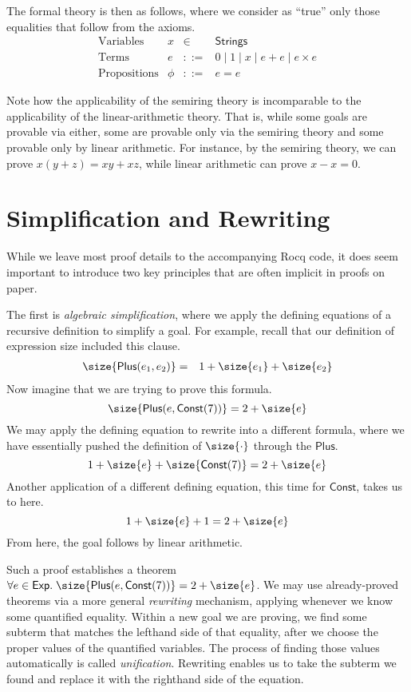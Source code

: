 \documentclass{amsbook}
\theoremstyle{definition}
\theoremstyle{remark}
\numberwithin{section}{chapter}
\numberwithin{equation}{chapter}
\begin{document}
The formal theory is then as follows, where we consider as ``true'' only those equalities that follow from the axioms.
$$\begin{array}{rrcl}
  \textrm{Variables} & x &\in& \mathsf{Strings} \\
  \textrm{Terms} & e &::=& 0 \mid 1 \mid x \mid e + e \mid e \times e \\
  \textrm{Propositions} & \phi &::=& e = e
\end{array}$$

Note how the applicability of the semiring theory is incomparable to the applicability of the linear-arithmetic theory.
That is, while some goals are provable via either, some are provable only via the semiring theory and some provable only by linear arithmetic.
For instance, by the semiring theory, we can prove $x(y + z) = xy + xz$, while linear arithmetic can prove $x - x = 0$.

\section{Simplification and Rewriting}

While we leave most proof details to the accompanying Rocq code, it does seem important to introduce two key principles that are often implicit in proofs on paper.

The first is \emph{algebraic simplification}, where we apply the defining equations of a recursive definition to simplify a goal.
For example, recall that our definition of expression size included this clause.
\begin{eqnarray*}
  \size{\mathsf{Plus}(e_1, e_2)} &=& 1 + \size{e_1} + \size{e_2}
\end{eqnarray*}
Now imagine that we are trying to prove this formula.
$$\size{\mathsf{Plus}(e, \mathsf{Const}(7))} = 2 + \size{e}$$
We may apply the defining equation to rewrite into a different formula, where we have essentially pushed the definition of $\size{\cdot}$ through the $\mathsf{Plus}$.
$$1 + \size{e} + \size{\mathsf{Const}(7)} = 2 + \size{e}$$
Another application of a different defining equation, this time for $\mathsf{Const}$, takes us to here.
$$1 + \size{e} + 1 = 2 + \size{e}$$
From here, the goal follows by linear arithmetic.

\medskip

Such a proof establishes a theorem $\forall e \in \mathsf{Exp}. \; \size{\mathsf{Plus}(e, \mathsf{Const}(7))} = 2 + \size{e}$.
We may use already-proved theorems via a more general \emph{rewriting} mechanism, applying whenever we know some quantified equality.
Within a new goal we are proving, we find some subterm that matches the lefthand side of that equality, after we choose the proper values of the quantified variables.
The process of finding those values automatically is called \emph{unification}.
Rewriting enables us to take the subterm we found and replace it with the righthand side of the equation.
\end{document}
